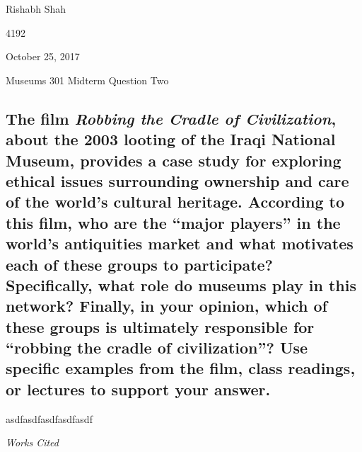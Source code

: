 \documentclass[11pt]{article}
\newenvironment{bib}[1]
  {\begin{list}
          {}
          {\setlength{\itemindent}{-#1}
           \setlength{\leftmargin}{#1}
           \setlength{\itemsep}{0pt}
           \setlength{\parsep}{\parskip}
           \setlength{\topsep}{\parskip}
           }
    \setlength{\parindent}{-#1}
    \item[]
  }
  {\end{list}}
\begin{document}
\singlespacing
{\Large\noindent Rishabh Shah

 4192

\noindent October 25, 2017

\noindent Museums 301 Midterm Question Two}

\subsection*{The film \textit{Robbing the Cradle of Civilization}, about the 2003 looting of the Iraqi National Museum, provides a case study for exploring ethical issues surrounding ownership and care of the world’s cultural heritage. According to this film, who are the ``major players'' in the world’s antiquities market and what motivates each of these groups to participate? Specifically, what role do museums play in this network? Finally, in your opinion, which of these groups is ultimately responsible for ``robbing the cradle of civilization''? Use specific examples from the film, class readings, or lectures to support your answer.}

\doublespacing
asdfasdfasdfasdfasdf

\newpage
\singlespacing
\begin{center}
{\large\textit{Works Cited}}
\end{center}

\begin{bib}{2em}

\end{bib}
\end{document}
